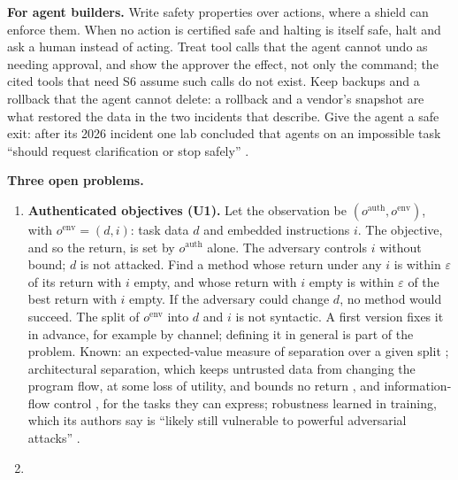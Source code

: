 \documentclass{article}
\providecommand{\tightlist}{\setlength{\itemsep}{0pt}\setlength{\parskip}{0pt}}
\begin{document}
\textbf{For agent builders.} Write safety properties over actions, where a shield can enforce them. When no action is certified safe and halting is itself safe, halt and ask a human instead of acting. Treat tool calls that the agent cannot undo as needing approval, and show the approver the effect, not only the command; the cited tools that need S6 assume such calls do not exist. Keep backups and a rollback that the agent cannot delete: a rollback and a vendor's snapshot are what restored the data in the two incidents that \citet{mclean2026} describe. Give the agent a safe exit: after its 2026 incident one lab concluded that agents on an impossible task ``should request clarification or stop safely'' \citep{openai2026b}.

\textbf{Three open problems.}

\begin{enumerate}
\def\labelenumi{\arabic{enumi}.}
\tightlist
\item
  \textbf{Authenticated objectives (U1).} Let the observation be \((o^{\mathrm{auth}}, o^{\mathrm{env}})\), with \(o^{\mathrm{env}} = (d, i)\): task data \(d\) and embedded instructions \(i\). The objective, and so the return, is set by \(o^{\mathrm{auth}}\) alone. The adversary controls \(i\) without bound; \(d\) is not attacked. Find a method whose return under any \(i\) is within \(\varepsilon\) of its return with \(i\) empty, and whose return with \(i\) empty is within \(\varepsilon\) of the best return with \(i\) empty. If the adversary could change \(d\), no method would succeed. The split of \(o^{\mathrm{env}}\) into \(d\) and \(i\) is not syntactic. A first version fixes it in advance, for example by channel; defining it in general is part of the problem. Known: an expected-value measure of separation over a given split \citep{zverev2025}; architectural separation, which keeps untrusted data from changing the program flow, at some loss of utility, and bounds no return \citep{debenedetti2025}, and information-flow control \citep{costa2025}, for the tasks they can express; robustness learned in training, which its authors say is ``likely still vulnerable to powerful adversarial attacks'' \citep{wallace2024}.
\item

\end{enumerate}
\end{document}
